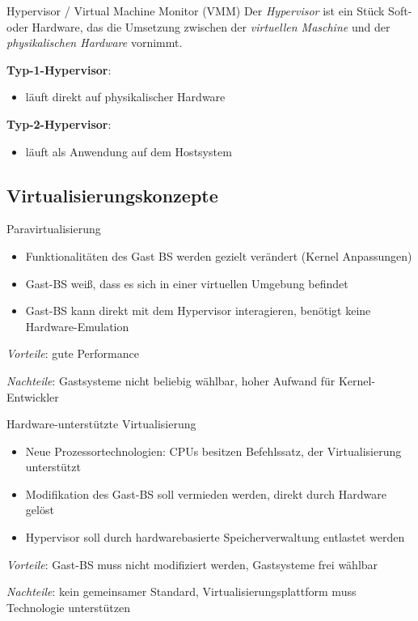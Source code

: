\documentclass[german]{../spicker}
\begin{document}
\begin{defi}{Hypervisor / Virtual Machine Monitor (VMM)}
    Der \emph{Hypervisor} ist ein Stück Soft- oder Hardware, das  die Umsetzung
    zwischen der \emph{virtuellen Maschine} und der \emph{physikalischen Hardware} vornimmt.

    \textbf{Typ-1-Hypervisor}:
    \begin{itemize}
        \item läuft direkt auf physikalischer Hardware
    \end{itemize}

    \textbf{Typ-2-Hypervisor}:
    \begin{itemize}
        \item läuft als Anwendung auf dem Hostsystem
    \end{itemize}
\end{defi}

\subsection{Virtualisierungskonzepte}

\begin{defi}{Paravirtualisierung}
    \begin{itemize}
        \item Funktionalitäten des Gast BS werden gezielt verändert (Kernel Anpassungen)
        \item Gast-BS \glqq weiß\grqq, dass es sich in einer virtuellen Umgebung befindet
        \item Gast-BS kann direkt mit dem Hypervisor interagieren, benötigt keine Hardware-Emulation
    \end{itemize}

    \emph{Vorteile}: gute Performance

    \emph{Nachteile}: Gastsysteme nicht beliebig wählbar, hoher Aufwand für Kernel-Entwickler
\end{defi}

\begin{defi}{Hardware-unterstützte Virtualisierung}
    \begin{itemize}
        \item Neue Prozessortechnologien: CPUs besitzen Befehlssatz, der Virtualisierung unterstützt
        \item Modifikation des Gast-BS soll vermieden werden, direkt durch Hardware gelöst
        \item Hypervisor soll durch hardwarebasierte Speicherverwaltung entlastet werden
    \end{itemize}

    \emph{Vorteile}: Gast-BS muss nicht modifiziert werden, Gastsysteme frei wählbar

    \emph{Nachteile}: kein gemeinsamer Standard, Virtualisierungsplattform muss Technologie unterstützen
\end{defi}
\end{document}
